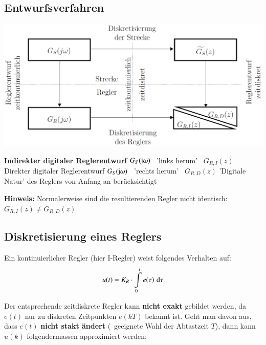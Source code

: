 \subsection{Entwurfsverfahren}

\begin{minipage}[c]{0.45\columnwidth}
    \includegraphics[width=\columnwidth]{images/direkter_indirekter_reglerentwurf_digital.png}  
\end{minipage}
\hfill
\begin{minipage}[c]{0.53\columnwidth}
    \begin{outline}
        \1  \textbf{Indirekter digitaler Reglerentwurf}
            \2 $G_S(\mathrm{j} \omega)$ \textrightarrow\ 'links herum' \textrightarrow\ $G_{R,I}(z)$
        \1 Direkter digitaler Reglerentwurf
            \2 $G_S(\mathrm{j} \omega)$ \textrightarrow\ 'rechts herum' \textrightarrow\ $G_{R,D}(z)$
            \2 'Digitale Natur' des Reglers von Anfang an berücksichtigt
    \end{outline}
\end{minipage}

\textbf{Hinweis:} Normalerweise sind die resultierenden Regler nicht identisch: $G_{R,I}(z) \neq G_{R,D}(z)$


\subsection{Diskretisierung eines Reglers}

Ein kontinuierlicher Regler (hier I-Regler) weist folgendes Verhalten auf:
$$ u(t) = K_R \cdot \int\limits_0^t e(\tau) \, \mathop{} \! \mathrm{d} \tau $$

Der entsprechende zeitdiskrete Regler kann \textbf{nicht exakt} gebildet werden, da $e(t)$ nur zu diskreten Zeitpunkten $e(kT)$ bekannt ist.
Geht man davon aus, dass $e(t)$ \textbf{nicht stakt ändert} (\textrightarrow\ geeignete Wahl der Abtastzeit $T$), dann kann $u(k)$
folgendermassen approximiert werden:

